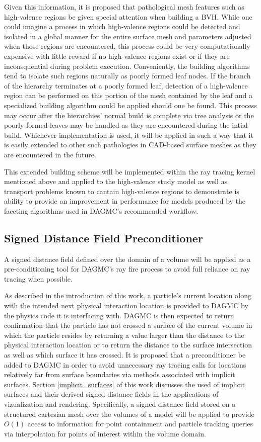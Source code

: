 \documentclass[12pt, a4paper]{article}
\begin{document}
Given this information, it is proposed that pathological mesh features such as high-valence regions be given special attention when building a BVH. While one could imagine a process in which high-valence regions could be detected and isolated in a global manner for the entire surface mesh and parameters adjusted when those regions are encountered, this process could be very computationally expensive with little reward if no high-valence regions exist or if they are inconsquential during problem execution. Conveniently, the building algorithms tend to isolate such regions naturally as poorly formed leaf nodes. If the branch of the hierarchy terminates at a poorly formed leaf, detection of a high-valence region can be performed on this portion of the mesh contained by the leaf and a specialized building algorithm could be applied should one be found. This process may occur after the hierarchies' normal build is complete via tree analysis or the poorly formed leaves may be handled as they are encountered during the intial build. Whichever implementation is used, it will be applied in such a way that it is easily extended to other such pathologies in CAD-based surface meshes as they are encountered in the future.

This extended building scheme will be implemented within the ray tracing kernel mentioned above and applied to the high-valence study model as well as transport problems known to cantain high-valence regions to demonstrate is ability to provide an improvement in performance for models produced by the faceting algorithms used in DAGMC's recommended workflow.

\subsection{Signed Distance Field Preconditioner}

A signed distance field defined over the domain of a volume will be applied as a pre-conditioning tool for DAGMC's ray fire process to avoid full reliance on ray tracing when possible.

As described in the introduction of this work, a particle's current location along with the intended next physical interaction location is provided to DAGMC by the physics code it is interfacing with. DAGMC is then expected to return confirmation that the particle has not crossed a surface of the current volume in which the particle resides by returning a value larger than the distance to the physical interaction location or to return the distance to the surface intersection as well as which surface it has crossed. It is proposed that a preconditioner be added to DAGMC in order to avoid unnecessary ray tracing calls for locations relatively far from surface boundaries via methods associated with implicit surfaces. Section \ref{implicit_surfaces} of this work discusses the used of implicit surfaces and their derived signed distance fields in the applications of vizualization and rendering. Specifically, a signed distance field stored on a structured cartesian mesh over the volumes of a model will be applied to provide $O(1)$ access to information for point containment and particle tracking queries via interpolation for points of interest within the volume domain.
\end{document}

